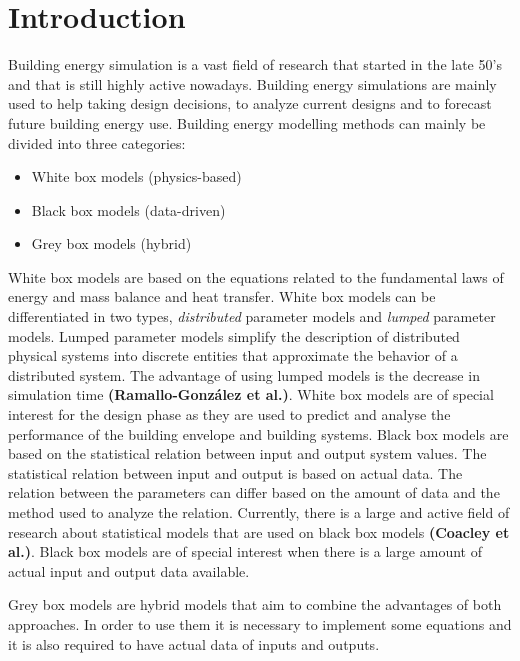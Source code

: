 
\section{Introduction}

Building energy simulation is a vast field of research that started in the late 50’s and that is still highly active nowadays. Building energy simulations are mainly used to help taking design decisions, to analyze current designs and to forecast future building energy use. Building energy modelling methods can mainly be divided into three categories:
\begin{itemize}
  
    \item White box models (physics-based)
    \item Black box models (data-driven)
    \item Grey box models (hybrid)

\end{itemize}


White box models are based on the equations related to the fundamental laws of energy and mass balance and heat transfer. White box models can be differentiated in two types, \emph{distributed} parameter models and \emph{lumped} parameter models. Lumped parameter models simplify the description of distributed physical systems into discrete entities that approximate the behavior of a distributed system. The advantage of using lumped models is the decrease in simulation time \textbf{(Ramallo-González et al.)}. White box models are of special interest for the design phase as they are used to predict and analyse the performance of the building envelope and building systems.
Black box models are based on the statistical relation between input and output system values. The statistical relation between input and output is based on actual data. The relation between the parameters can differ based on the amount of data and the method used to analyze the relation. Currently, there is a large and active field of research about statistical models that are used on black box models \textbf{(Coacley et al.)}. Black box models are of special interest when there is a large amount of actual input and output data available. 

Grey box models are hybrid models that aim to combine the advantages of both approaches. In order to use them it is necessary to implement some equations and it is also required to have actual data of inputs and outputs.

\newpage
